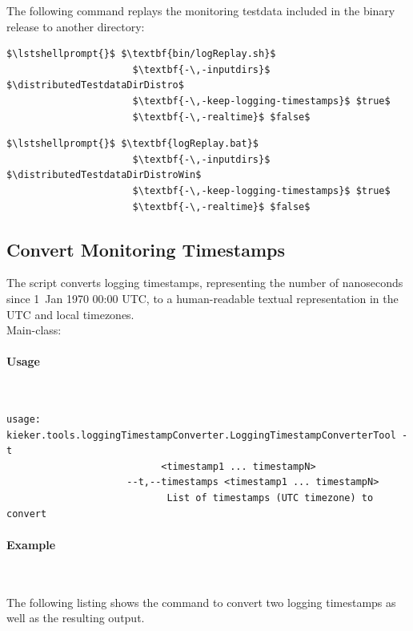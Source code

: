 				\noindent The following command replays the monitoring testdata included in the binary release to another directory:

				\setTextListing
				\begin{lstlisting}[gobble = 10, caption=Execution under UNIX-like systems]
					$\lstshellprompt{}$ $\textbf{bin/logReplay.sh}$
					  $\textbf{-\,-inputdirs}$ $\distributedTestdataDirDistro$ 
					  $\textbf{-\,-keep-logging-timestamps}$ $true$ 
					  $\textbf{-\,-realtime}$ $false$
				\end{lstlisting}
				\begin{lstlisting}[gobble = 10, caption=Execution under Windows]
					$\lstshellprompt{}$ $\textbf{logReplay.bat}$
					  $\textbf{-\,-inputdirs}$ $\distributedTestdataDirDistroWin$ 
					  $\textbf{-\,-keep-logging-timestamps}$ $true$ 
					  $\textbf{-\,-realtime}$ $false$
				\end{lstlisting}
		
		\subsection{Convert Monitoring Timestamps}
		
			The script converts \KiekerMonitoringPart{} logging timestamps, representing the number of nanoseconds since 1~Jan 1970 00:00 UTC, to a human-readable textual representation in the UTC and local timezones.\\
			
			\noindent Main-class: {\small {}}

			\paragraph*{Usage}\

				\setTextListing
				\begin{lstlisting}[gobble = 10]
					usage: kieker.tools.loggingTimestampConverter.LoggingTimestampConverterTool -t
						   <timestamp1 ... timestampN>
					 --t,--timestamps <timestamp1 ... timestampN>
							List of timestamps (UTC timezone) to convert
				\end{lstlisting}

			\paragraph*{Example}\

				\noindent
				The following listing shows the command to convert two logging timestamps as well as the resulting output.

